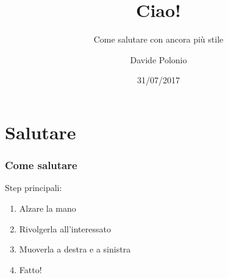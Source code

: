 \documentclass{beamer}
\title{Ciao!}
\subtitle{Come salutare con ancora più stile}
\date{31/07/2017}
\author{Davide Polonio}
\institute{Università degli studi di Padova}
\begin{document}
 \begin{frame}
  \maketitle
 \end{frame}

 \section{Salutare}
 \begin{frame} %
  \frametitle{Come salutare} %

  \transdissolve %

  Step principali:
  \begin{enumerate} %
   \item<1-> Alzare la mano
   \item<2-> Rivolgerla all'interessato
   \item<3-> Muoverla a destra e a sinistra
   \item<4-> Fatto!
  \end{enumerate}
 \end{frame}
\end{document}
